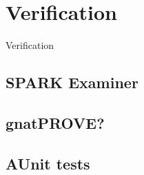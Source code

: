 
\cleardoublepage


\chapter{Verification}
\label{verification}

Verification

\section{SPARK Examiner}

\cite{Examiner:Online}

\section{gnatPROVE?}

\section{AUnit tests}


